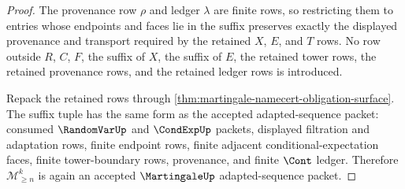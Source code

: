 \begin{proof}
The provenance row $\rho$ and ledger $\lambda$ are finite rows, so restricting them to entries whose endpoints and faces lie in the suffix preserves exactly the displayed provenance and transport required by the retained $X$, $E$, and $T$ rows. No row outside $R$, $C$, $F$, the suffix of $X$, the suffix of $E$, the retained tower rows, the retained provenance rows, and the retained ledger rows is introduced.

Repack the retained rows through \autoref{thm:martingale-namecert-obligation-surface}. The suffix tuple has the same form as the accepted adapted-sequence packet: consumed $\RandomVarUp$ and $\CondExpUp$ packets, displayed filtration and adaptation rows, finite endpoint rows, finite adjacent conditional-expectation faces, finite tower-boundary rows, provenance, and finite $\Cont$ ledger. Therefore $\mathcal{M}_{\ge n}^{k}$ is again an accepted $\MartingaleUp$ adapted-sequence packet.
\end{proof}
